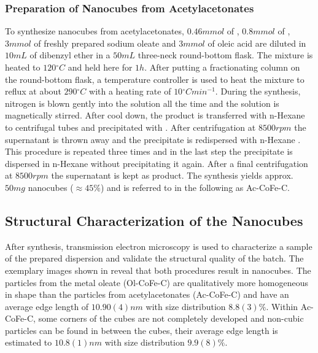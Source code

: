 \documentclass[\main/dresen_thesis.tex]{subfiles}
\begin{document}
    \subsubsection{Preparation of Nanocubes from Acetylacetonates}
      To synthesize nanocubes from acetylacetonates, $0.46 \unit{mmol}$ of , $0.8 \unit{mmol}$ of , $3 \unit{mmol}$ of freshly prepared sodium oleate and $3 \unit{mmol}$ of oleic acid are diluted in $10 \unit{mL}$ of dibenzyl ether in a $50 \unit{mL}$ three-neck round-bottom flask.
      The mixture is heated to $120 \unit{^\circ C}$ and held here for $1 \unit{h}$.
      After putting a fractionating column on the round-bottom flask, a temperature controller is used to heat the mixture to reflux at about $290 \unit{^\circ C}$ with a heating rate of $10 \unit{^\circ C min^{-1}}$.
      During the synthesis, nitrogen is blown gently into the solution all the time and the solution is magnetically stirred.
      After cool down, the product is transferred with n-Hexane to centrifugal tubes and precipitated with .
      After centrifugation at $8500 \unit{rpm}$ the supernatant is thrown away and the precipitate is redispersed with n-Hexane .
      This procedure is repeated three times and in the last step the precipitate is dispersed in n-Hexane without precipitating it again.
      After a final centrifugation at $8500 \unit{rpm}$ the supernatant is kept as product.
      The synthesis yields approx. $50 \unit{mg}$ nanocubes ($\approx 45 \%$) and is referred to in the following as Ac-CoFe-C.

  \subsection{Structural Characterization of the Nanocubes}
  \label{sec:monolayers:nanoparticle:structuralCharacterization}
    After synthesis, transmission electron microscopy is used to characterize a sample of the prepared dispersion and validate the structural quality of the batch.
    The exemplary images shown in  reveal that both procedures result in nanocubes.
    The particles from the metal oleate (Ol-CoFe-C) are qualitatively more homogeneous in shape than the particles from acetylacetonates (Ac-CoFe-C) and have an average edge length of $10.90(4) \unit{nm}$ with size distribution $8.8(3) \unit{\%}$.
    Within Ac-CoFe-C, some corners of the cubes are not completely developed and non-cubic particles can be found in between the cubes, their average edge length is estimated to $10.8(1) \unit{nm}$ with size distribution $9.9(8) \unit{\%}$.
\end{document}
